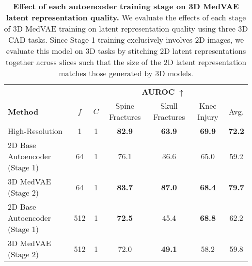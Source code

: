 \begin{table*}[t]
\centering
\resizebox{0.8\linewidth}{!}
{%
\begin{tabular}{ lcccccc }
\toprule
\textbf{}
& \multicolumn{2}{c}{\textbf{}}
& \multicolumn{3}{c}{\textbf{AUROC} $\uparrow$}
& \textbf{}
\\
\cmidrule(l{3pt}r{0pt}){4-6}
\cmidrule(l{3pt}r{0pt}){7-7}
\textbf{Method}
& \textbf{$f$}
& \textbf{$C$}
& \small Spine Fractures
& \small Skull Fractures
& \small Knee Injury
& Avg.
\\ 
\midrule
\small High-Resolution & 1 & 1 & \textbf{82.9} & \textbf{63.9} & \textbf{69.9} & \textbf{72.2}\\

\midrule
\small 2D Base Autoencoder (Stage 1) \hspace{0.5mm} & 64 & 1 & 76.1 & 36.6 & 65.0 & 59.2 \\
\small 3D MedVAE (Stage 2) \hspace{0.5mm} & 64 & 1 & \textbf{83.7} & \textbf{87.0} & \textbf{68.4} & {\textbf{79.7}} \\
\midrule

\small 2D Base Autoencoder (Stage 1) \hspace{0.5mm} & 512 & 1 & \textbf{72.5 } & 45.4 & \textbf{68.8} & 62.2 \\
\small 3D MedVAE (Stage 2) \hspace{0.5mm} & 512 & 1  & 72.0 & \textbf{49.1} & 58.2 & 59.8\\
\bottomrule
\end{tabular}
}
\caption{\textbf{Effect of each autoencoder training stage on 3D MedVAE latent representation quality.} We evaluate the effects of each stage of 3D MedVAE training on latent representation quality using three 3D CAD tasks. Since Stage 1 training exclusively involves 2D images, we evaluate this model on 3D tasks by stitching 2D latent representations together across slices such that the size of the 2D latent representation matches those generated by 3D models.}
\vspace{-1mm}
\label{table:ablations3d}
\end{table*}





